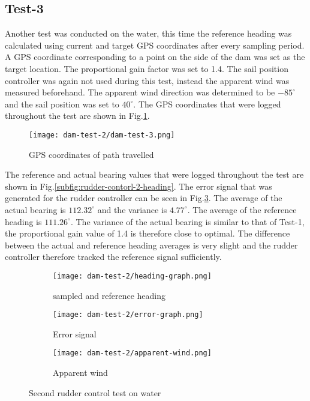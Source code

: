 \subsection{Test-3}
\label{test-3}
Another test was conducted on the water, this time the reference heading was calculated using current and target GPS coordinates after every sampling period. A GPS coordinate corresponding to a 
point on the side of the dam was set as the target location. The proportional gain factor was set to 1.4. The sail position controller was again not used during this test, instead the apparent wind
was measured beforehand. The apparent wind direction was determined to be $-85^{\circ}$ and the sail position was set to $40^{\circ}$. The GPS coordinates that were logged throughout the test 
are shown in Fig.\ref{fig:rudder-control-test-2-path}.

\begin{figure}[h!]
    \centering
    \texttt{[image: dam-test-2/dam-test-3.png]}
    \caption[Path travelled in first rudder control test]{GPS coordinates of path travelled}
    \label{fig:rudder-control-test-2-path}
\end{figure}

The reference and actual bearing values that were logged throughout the test are shown in Fig.\ref{subfig:rudder-contorl-2-heading}. The error signal that was generated for the rudder controller 
can be seen in Fig.\ref{subfig:rudder-control-2-error}. The average of the actual bearing is $112.32^{\circ}$ and the variance is $4.77^{\circ}$. The average of the reference heading is
$111.26^{\circ}$. The variance of the actual bearing is similar to that of Test-1, the proportional gain value of 1.4 is therefore close to optimal. The difference between the actual and reference 
heading averages is very slight and the rudder controller therefore tracked the reference signal sufficiently.

\begin{figure}[h!]
    \centering
    \begin{subfigure}{=0.75\linewidth}
        \centering
        \texttt{[image: dam-test-2/heading-graph.png]}
        \caption{sampled and reference heading}
        \label{subfig:rudder-control-2-heading}
    \end{subfigure}

    \begin{subfigure}{=0.75\linewidth}
        \centering
        \texttt{[image: dam-test-2/error-graph.png]}
        \caption{Error signal}
        \label{subfig:rudder-control-2-error}
    \end{subfigure}

    \begin{subfigure}{=0.75\linewidth}
        \centering
        \texttt{[image: dam-test-2/apparent-wind.png]}
        \caption{Apparent wind}
        \label{subfig:rudder-control-2-wind}
    \end{subfigure}

    \caption[Second rudder control test on water]{Second rudder control test on water}
    \label{fig:rudder-control-2-water}
\end{figure}

